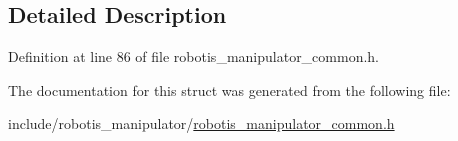 \subsection{Detailed Description}


Definition at line 86 of file robotis\+\_\+manipulator\+\_\+common.\+h.



The documentation for this struct was generated from the following file\+:\begin{DoxyCompactItemize}
\item 
include/robotis\+\_\+manipulator/\hyperlink{robotis__manipulator__common_8h}{robotis\+\_\+manipulator\+\_\+common.\+h}\end{DoxyCompactItemize}
